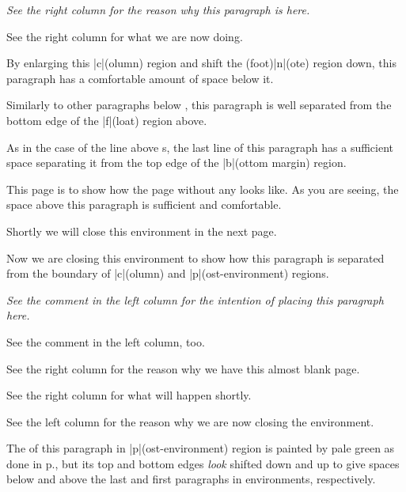 \begin{paracol}{2}
\switchcolumn
\begingroup\it
See the right column for the reason why this paragraph is here.
\par\vfill

See the right column for what we are now doing.
\par\endgroup
\switchcolumn

By enlarging this |c|(olumn) region and shift the (foot)|n|(ote) region
down, this paragraph has a comfortable amount of space below it.
\flushpage

Similarly to other paragraphs below \pwstuff, this paragraph is well
separated from the bottom edge of the |f|(loat) region above.

\par\vfill\label{page:bgpaint-me2}

As in the case of the line above \Scfnote{}s, the last line of this
paragraph has a sufficient space separating it from the top edge of the
|b|(ottom margin) region.
\par\newpage

This page is to show how the page without any \pwstuff{} looks like.  As
you are seeing, the space above this paragraph is sufficient and
comfortable.
\par\vfill

Shortly we will close this  environment in the next page.
\par\newpage

Now we are closing this  environment to show how this
paragraph is separated from the boundary of |c|(olumn) and
|p|(ost-environment) regions.

\switchcolumn
\begingroup\it
See the comment in the left column for the intention of placing this
paragraph here.
\par\vfill

See the comment in the left column, too.
\par\newpage

See the right column for the reason why we have this almost blank page.
\par\vfill

See the right column for what will happen shortly.
\par\newpage

See the left column for the reason why we are now closing the environment.
\endgroup
\end{paracol}
\bigskip

The \bground{} of this paragraph in |p|(ost-environment) region is
painted by pale green as done in p.\Tie\pageref{page:bgpaint4}, but its top
and bottom edges \emph{look} shifted down and up to give spaces below and
above the last and first paragraphs in  environments,
respectively.

